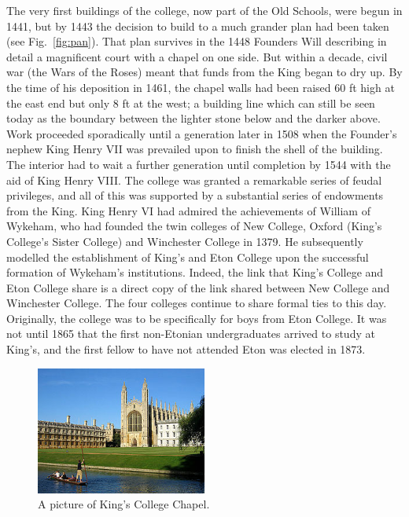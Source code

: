 \documentclass{report}
\begin{document}
The very first buildings of the college, now part of the Old Schools, were begun in 1441, but by 1443 the decision to build to a much grander plan had been taken (see Fig.~\ref{fig:pan}). That plan survives in the 1448 Founders Will describing in detail a magnificent court with a chapel on one side. But within a decade, civil war (the Wars of the Roses) meant that funds from the King began to dry up. By the time of his deposition in 1461, the chapel walls had been raised 60 ft high at the east end but only 8 ft at the west; a building line which can still be seen today as the boundary between the lighter stone below and the darker above. Work proceeded sporadically until a generation later in 1508 when the Founder's nephew King Henry VII was prevailed upon to finish the shell of the building. The interior had to wait a further generation until completion by 1544 with the aid of King Henry VIII. The college was granted a remarkable series of feudal privileges, and all of this was supported by a substantial series of endowments from the King. King Henry VI had admired the achievements of William of Wykeham, who had founded the twin colleges of New College, Oxford (King's College's Sister College) and Winchester College in 1379. He subsequently modelled the establishment of King's and Eton College upon the successful formation of Wykeham's institutions. Indeed, the link that King's College and Eton College share is a direct copy of the link shared between New College and Winchester College. The four colleges continue to share formal ties to this day. Originally, the college was to be specifically for boys from Eton College. It was not until 1865 that the first non-Etonian undergraduates arrived to study at King's, and the first fellow to have not attended Eton was elected in 1873. \\

\newpage
\begin{figure}[h!]
  \caption{A picture of King's College Chapel.}
  \centering
    \includegraphics[width=0.5\textwidth]{Pictures/Kings.jpg}
\end{figure}
 
\end{document}
